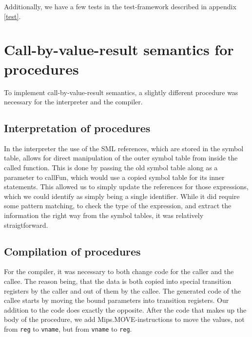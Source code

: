 \documentclass{article}
\begin{document}
Additionally, we have a few tests in the test-framework described in appendix \ref{test}.

\section{Call-by-value-result semantics for procedures}
To implement call-by-value-result semantics, a slightly different procedure was necessary
for the interpreter and the compiler. 

\subsection{Interpretation of procedures}
In the interpreter the use of the SML references,
which are stored in the symbol table, allows for direct manipulation of the outer symbol table from inside the called function.
This is done by passing the old symbol table along as a parameter to callFun, which would use a copied symbol table for its inner statements.
This allowed us to simply update the references for those expressions, which we could identify as simply being a single identifier.
While it did require some pattern matching, to check the type of the expression, and extract the information the right way
from the symbol tables, it was relatively straigtforward.
\subsection{Compilation of procedures}
For the compiler, it was necessary to both change code for the caller and the callee.
The reason being, that the data is both copied into special transition registers by the caller and out of them by the callee.
The generated code of the callee starts by moving the bound parameters into transition registers. Our addition to the code
does exactly the opposite. After the code that makes up the body of the procedure, we add Mips.MOVE-instructions
to move the values, not from \texttt{reg} to \texttt{vname}, but from \texttt{vname} to \texttt{reg}.
\end{document}
